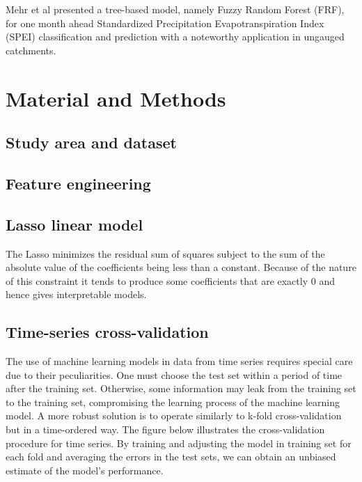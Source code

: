 \documentclass[smallextended]{svjour3}       %
\begin{document}
Mehr et al \cite{danandehmehr2020neurofuzzy} presented a tree-based model, namely
Fuzzy Random Forest (FRF), for one month ahead Standardized
Precipitation Evapotranspiration Index (SPEI) classification and
prediction with a noteworthy application in ungauged catchments.


\section{Material and Methods}\label{sec:prob_formulation}

\subsection{Study area and dataset}

\subsection{Feature engineering}

\subsection{Lasso linear model}

The Lasso \cite{tibshirani1996lasso} minimizes the residual sum of squares subject to the sum of the absolute value of the coefficients being less than a constant. Because of the nature of this constraint it tends to produce some coefficients that are exactly 0 and hence gives interpretable models. 

\subsection{Time-series cross-validation}

The use of machine learning models in data from time series requires special care due to their peculiarities. One must choose the test set within a period of time after the training set. Otherwise, some information may leak from the training set to the training set, compromising the learning process of the machine learning model. A more robust solution is to operate similarly to k-fold cross-validation but in a time-ordered way. The figure below illustrates the cross-validation procedure for time series. By training and adjusting the model in training set for each fold and averaging the errors in the test sets, we can obtain an unbiased estimate of the model's performance.
\end{document}
